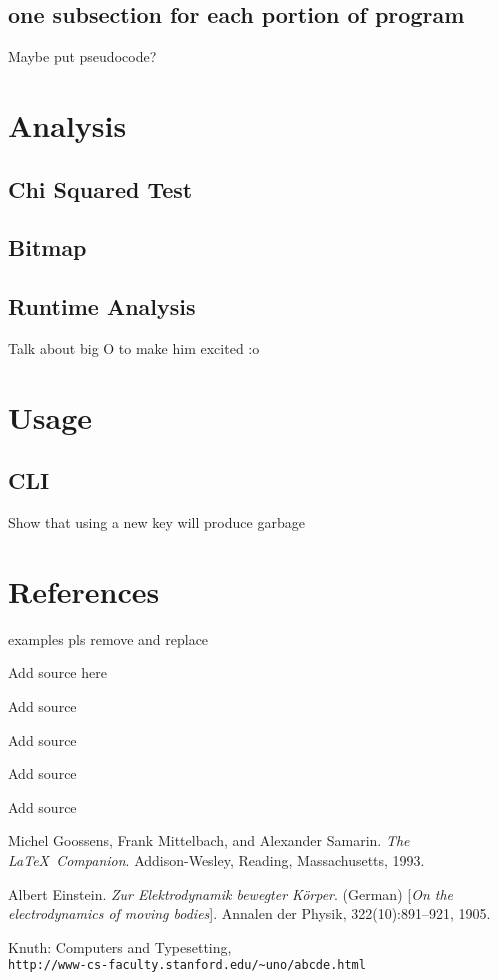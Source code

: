 \documentclass{article}
\begin{document}
\subsection{one subsection for each portion of program}
Maybe put pseudocode?


\section{Analysis}
\subsection{Chi Squared Test}
\subsection{Bitmap}
\subsection{Runtime Analysis}
Talk about big O to make him excited :o


\section{Usage}
\subsection{CLI}
Show that using a new key will produce garbage


\section{References}
{\huge{examples pls remove and replace}}
\begin{thebibliography}{9}
Add source here

Add source

Add source

Add source

Add source

Michel Goossens, Frank Mittelbach, and Alexander Samarin. 
\textit{The \LaTeX\ Companion}. 
Addison-Wesley, Reading, Massachusetts, 1993.

Albert Einstein. 
\textit{Zur Elektrodynamik bewegter K{\"o}rper}. (German) 
[\textit{On the electrodynamics of moving bodies}]. 
Annalen der Physik, 322(10):891–921, 1905.

Knuth: Computers and Typesetting,
\\\texttt{http://www-cs-faculty.stanford.edu/\~{}uno/abcde.html}
\end{thebibliography}
         
\end{document}

